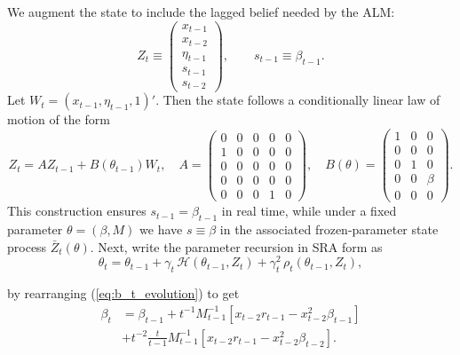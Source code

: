 \documentclass[11pt]{article}
\begin{document}
We augment the state to include the lagged belief needed by the ALM:
\[
Z_t \equiv 
\begin{pmatrix}
x_{t-1}\\
x_{t-2}\\
\eta_{t-1}\\
s_{t-1} \\
s_{t-2}
\end{pmatrix},
\qquad s_{t-1}\equiv \beta_{t-1}.
\]
Let $W_t=(x_{t-1},\eta_{t-1},1)'$. Then the state follows a conditionally linear law of motion of the form 
\[
Z_t = A Z_{t-1} + B(\theta_{t-1})W_{t},
\quad
A=
\begin{pmatrix}
0&0&0&0&0\\
1&0&0&0&0\\
0&0&0&0&0\\
0&0&0&0&0\\
0&0&0&1&0
\end{pmatrix},
\quad
B(\theta)=
\begin{pmatrix}
1&0&0\\
0&0&0\\
0&1&0\\
0&0&\beta\\
0&0&0
\end{pmatrix}.
\]
This construction ensures $s_{t-1}=\beta_{t-1}$ in real time, while under a fixed parameter $\theta=(\beta,M)$ we have $s\equiv \beta$ in the associated frozen-parameter state process $\bar Z_t(\theta)$. Next, write the parameter recursion in SRA form as
\[
\theta_t=\theta_{t-1}+\gamma_t\,\mathcal H(\theta_{t-1},Z_t)+\gamma_t^2\,\rho_t(\theta_{t-1},Z_t),
\]

by rearranging (\ref{eq:b_t_evolution}) to get
\begin{equation}
    \begin{aligned}
        \beta_t & = \beta_{t-1} + t^{-1} M^{-1}_{t-1} \left[ x_{t-2} r_{t-1} - x_{t-2}^2 \beta_{t-1} \right] \\
        & + t^{-2} \frac{t}{t-1} M^{-1}_{t-1} \left[ x_{t-2} r_{t-1} - x_{t-2}^2 \beta_{t-2} \right].
    \end{aligned}
\end{equation}
\end{document}
